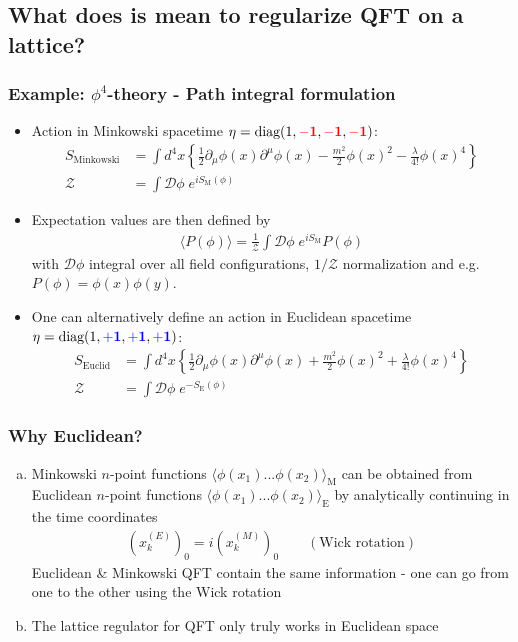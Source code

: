 \documentclass[10pt,a4paper]{article}
\theoremstyle{definition}
\begin{document}
\subsection{What does is mean to regularize QFT on a lattice?}

\subsubsection{Example: $\phi^4$-theory - Path integral formulation}
\begin{itemize}
\item Action in Minkowski spacetime $\eta=\text{diag}(1,\textcolor{red}{\bf-1},\textcolor{red}{\bf-1},\textcolor{red}{\bf-1})$: 
\begin{align}
S_\text{Minkowski}&=\int d^4x\left\{\frac{1}{2}\partial_\mu\phi(x)\partial^\mu\phi(x)-\frac{m^2}{2}\phi(x)^2-\frac{\lambda}{4!}\phi(x)^4\right\}\\
\mathcal{Z}&=\int \mathcal{D}\phi\; e^{iS_\text{M}(\phi)}
\end{align}
\item Expectation values are then defined by
\begin{align}
\langle P(\phi)\rangle =\frac{1}{\mathcal{Z}}\int \mathcal{D}\phi\; e^{iS_\text{M}}P(\phi)
\end{align}
with $\mathcal{D}\phi$ integral over all field configurations, $1/\mathcal{Z}$ normalization  and e.g. $P(\phi)=\phi(x)\phi(y)$.
\item One can alternatively define an action in Euclidean spacetime $\eta=\text{diag}(1,\textcolor{blue}{\bf+1},\textcolor{blue}{\bf+1},\textcolor{blue}{\bf+1})$: 
\begin{align}
S_\text{Euclid}&=\int d^4x\left\{\frac{1}{2}\partial_\mu\phi(x)\partial^\mu\phi(x)+\frac{m^2}{2}\phi(x)^2+\frac{\lambda}{4!}\phi(x)^4\right\}\\
\mathcal{Z}&=\int \mathcal{D}\phi\; e^{-S_\text{E}(\phi)}
\end{align}
\end{itemize}
\subsubsection*{Why Euclidean?}
\begin{enumerate}[(a)]
\item Minkowski $n$-point functions $\langle\phi(x_1)...\phi(x_2)\rangle_\text{M}$ can be obtained from Euclidean $n$-point functions $\langle\phi(x_1)...\phi(x_2)\rangle_\text{E}$ by analytically continuing in the time coordinates
\begin{align}
(x^{(E)}_k)_0=i(x^{(M)}_k)_0\qquad(\text{Wick rotation})
\end{align}
Euclidean \& Minkowski QFT contain the same information - one can go from one to the other using the Wick rotation
\item The lattice regulator for QFT only truly works in Euclidean space 
\end{enumerate}
\end{document}
